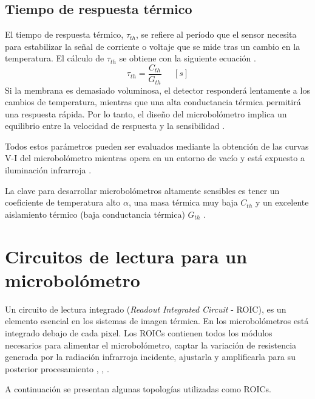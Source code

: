         \subsection{Tiempo de respuesta térmico}
         El tiempo de respuesta térmico, $\tau_{th}$, se refiere al período que el sensor necesita para estabilizar la señal de corriente o voltaje que se mide tras un cambio en la temperatura. El cálculo de $\tau_{th}$ se obtiene con la siguiente ecuación \cite{Jimenez}.
        \begin{equation}
        \tau_{th} =\frac{C_{th}}{G_{th}}\phantom{abc} [s]
        \label{eq:Tth}
        \end{equation}          
Si la membrana es demasiado voluminosa, el detector responderá lentamente a los cambios de temperatura, mientras que una alta conductancia térmica permitirá una respuesta rápida. Por lo tanto, el diseño del microbolómetro implica un equilibrio entre la velocidad de respuesta y la sensibilidad \cite{Jimenez}.        
        

Todos estos parámetros pueden ser evaluados mediante la obtención de las curvas V-I del microbolómetro mientras opera en un entorno de vacío y está expuesto a iluminación infrarroja \cite{Hernandez2021}.

        
La clave para desarrollar microbolómetros altamente sensibles es tener un coeficiente de temperatura alto $\alpha$, una masa térmica muy baja $C_{th}$ y un excelente aislamiento térmico (baja conductancia térmica) $G_{th}$ \cite{Rogalski}.

\section{Circuitos de lectura para un microbolómetro}

Un circuito de lectura integrado (\textit{Readout Integrated Circuit} - ROIC), es un elemento esencial en los sistemas de imagen térmica. En los microbolómetros está integrado debajo de cada pixel. Los ROICs contienen todos los módulos necesarios para alimentar el microbolómetro, captar la variación de resistencia generada por la radiación infrarroja incidente, ajustarla y amplificarla para su posterior procesamiento \cite{BlancoMDA}, \cite{Budzier}, \cite{Fusetto2023}.


A continuación se presentan algunas topologías utilizadas como ROICs.

